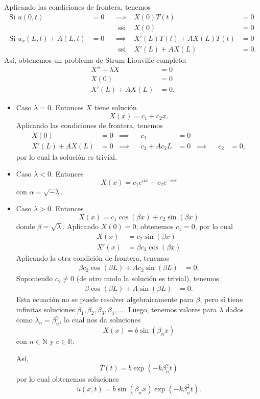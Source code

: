 \documentclass[11pt,letterpaper,draft]{report}
\theoremstyle{plain}
\theoremstyle{definition}
\theoremstyle{remark}
\newcommand\R{\mathbb R}
\newcommand\N{\mathbb N}
\newcommand\<{\langle}
\renewcommand\>{\rangle}
\begin{document}
Aplicando las condiciones de frontera, tenemos
\begin{align*}
  \text{Si } u(0,t)&=0
  & &\implies &
  X(0)T(t)&=0 \\
  && &\text{ ssi } &
  X(0)&=0 \\
  \text{Si } u_x(L,t)+A(L,t)&=0
  & &\implies &
  X'(L)T(t)+AX(L)T(t)&=0 \\
  && &\text{ ssi } &
  X'(L)+AX(L)&=0.
\end{align*}
Así, obtenemos un problema de Strum-Liouville completo:
\begin{align*}
  X''+\lambda X &= 0 \\
  X(0) &= 0 \\
  X'(L) + AX(L) &= 0.
\end{align*}
\begin{itemize}
  \item Caso $\lambda=0$.
  Entonces $X$ tiene solución
  \[
    X(x) = c_1 + c_2x
  .\]
  Aplicando las condiciones de frontera, tenemos
  \begin{align*}
    X(0)&=0
    &\implies &&
    c_1&=0
    \\
    X'(L)+AX(L)&=0
    &\implies &&
    c_2+Ac_2L&=0
    &\implies &&
    c_2 &= 0,
  \end{align*}
  por lo cual la solución es trivial.

  \item Caso $\lambda<0$.
  Entonces
  \[
    X(x) = c_1e^{\alpha x} + c_2e^{-\alpha x}
  \]
  con $\alpha=\sqrt{-\lambda}$.

  \item Caso $\lambda>0$.
  Entonces
  \[
    X(x) = c_1\cos(\beta x) + c_2\sin(\beta x)
  \]
  donde $\beta = \sqrt\lambda$.
  Aplicando $X(0)=0$, obtenemos $c_1=0$, por lo cual
  \begin{align*}
    X(x) &= c_2\sin(\beta x) \\
    X'(x) &= \beta c_2\cos(\beta x)
  \end{align*}
  Aplicando la otra condición de frontera, tenemos
  \begin{align*}
    \beta c_2\cos(\beta L)+Ac_2\sin(\beta L) &= 0.
  \end{align*}
  Suponiendo $c_2\neq 0$ (de otro modo la solución es trivial),
  tenemos
  \begin{align*}
    \beta\cos(\beta L)+A\sin(\beta L) &= 0.
  \end{align*}
  Esta ecuación no se puede resolver algebraicamente para
  $\beta$, pero sí tiene infinitas soluciones
  $\beta_1,\beta_2,\beta_3,\beta_4,\dots$.
  Luego, tenemos valores para $\lambda$ dados como
  $\lambda_n=\beta_n^2$, lo cual nos da soluciones
  \[
    X(x) = b\sin(\beta_n x)
  \]
  con $n\in\N$ y $c\in\R$.

  Así,
  \[
    T(t) = b\exp(-k\beta_n^2 t)
  \]
  por lo cual obtenemos soluciones
  \[
    u(x,t)
    =b\sin(\beta_n x)\exp(-k\beta_n^2 t)
  .\]
\end{itemize}
\end{document}
